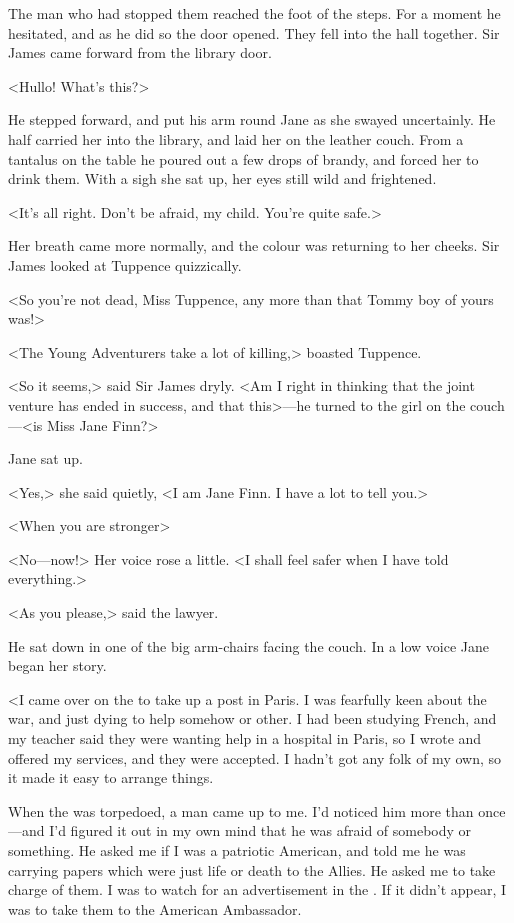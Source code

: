 The man who had stopped them reached the foot of the steps. For a moment he hesitated, and as he did so the door opened. They fell into the hall together. Sir James came forward from the library door.

<Hullo! What's this?>

He stepped forward, and put his arm round Jane as she swayed uncertainly. He half carried her into the library, and laid her on the leather couch. From a tantalus on the table he poured out a few drops of brandy, and forced her to drink them. With a sigh she sat up, her eyes still wild and frightened.

<It's all right. Don't be afraid, my child. You're quite safe.>

Her breath came more normally, and the colour was returning to her cheeks. Sir James looked at Tuppence quizzically.

<So you're not dead, Miss Tuppence, any more than that Tommy boy of yours was!>

<The Young Adventurers take a lot of killing,> boasted Tuppence.

<So it seems,> said Sir James dryly. <Am I right in thinking that the joint venture has ended in success, and that this>—he turned to the girl on the couch—<is Miss Jane Finn?>

Jane sat up.

<Yes,> she said quietly, <I am Jane Finn. I have a lot to tell you.>

<When you are stronger\longdash>

<No—now!> Her voice rose a little. <I shall feel safer when I have told everything.>

<As you please,> said the lawyer.

He sat down in one of the big arm-chairs facing the couch. In a low voice Jane began her story.

<I came over on the  to take up a post in Paris. I was fearfully keen about the war, and just dying to help somehow or other. I had been studying French, and my teacher said they were wanting help in a hospital in Paris, so I wrote and offered my services, and they were accepted. I hadn't got any folk of my own, so it made it easy to arrange things.

When the  was torpedoed, a man came up to me. I'd noticed him more than once—and I'd figured it out in my own mind that he was afraid of somebody or something. He asked me if I was a patriotic American, and told me he was carrying papers which were just life or death to the Allies. He asked me to take charge of them. I was to watch for an advertisement in the . If it didn't appear, I was to take them to the American Ambassador.

